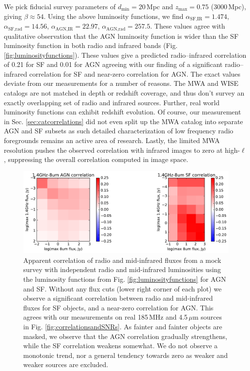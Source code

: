 \documentclass[numberedappendix]{emulateapj}
\newcommand{\mintext}{\text{min}}
\newcommand{\maxtext}{\text{max}}
\begin{document}
We pick fiducial survey parameters of $d_\mintext=20$\,Mpc and $z_\maxtext=0.75$ (3000\,Mpc), giving $\beta\approx54$.  Using the above luminosity functions, we find $\alpha_{\text{SF,IR}}=1.474$, $\alpha_{\text{SF,rad}}=14.56$, $\alpha_{\text{AGN,IR}}=22.97$, $\alpha_{\text{AGN,rad}}=257.5$. These values agree with qualitative observation that the AGN luminosity function is wider than the SF luminosity function in both radio and infrared bands (Fig. \ref{fig:luminosityfunctions}). These values give a predicted radio--infrared correlation of 0.21 for SF and 0.01 for AGN agreeing with our finding of a significant radio--infrared correlation for SF and near-zero correlation for AGN. The exact values deviate from our measurements for a number of reasons. The MWA and WISE catalogs are not matched in depth or redshift coverage, and thus don't survey an exactly overlapping set of radio and infrared sources. Further, real world luminosity functions can exhibit redshift evolution. Of course, our measurement in Sec. \ref{sec:catcorrelations} did not even split up the MWA catalog into separate AGN and SF subsets as such detailed characterization of low frequency radio foregrounds remains an active area of research. Lastly, the limited MWA resolution pushes the observed correlation with infrared images to zero at high-$\ell$, suppressing the overall correlation computed in image space.

\begin{figure}[h]
\centering
\includegraphics[width=6in]{images/sim_correlation_agn_and_sf.pdf}
\caption{Apparent correlation of radio and mid-infrared fluxes from a mock survey with independent radio and mid-infrared luminosities using the luminosity functions from Fig. \ref{fig:luminosityfunctions} for AGN and SF. Without any flux cuts (lower right corner of each plot) we observe a significant correlation between radio and mid-infrared fluxes for SF objects, and a near-zero correlation for AGN. This agrees with our measurements on real 185\,MHz and 4.5\,$\mu$m sources in Fig. \ref{fig:correlationsandSNRs}. As fainter and fainter objects are masked, we observe that the AGN correlation gradually strengthens, while the SF correlation weakens somewhat. We do not observe a monotonic trend, nor a general tendency towards zero as weaker and weaker sources are excluded. }
\label{fig:simagnlfcorrelations}
\end{figure}
\end{document}
